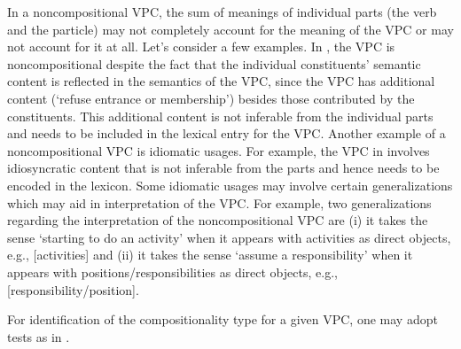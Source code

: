 \documentclass[output=paper
,modfonts
,nonflat]{langsci/langscibook}
\begin{document}
In a noncompositional VPC, the sum of meanings of individual parts (the verb and the particle) may not completely account for the meaning of the VPC or may not account for it at all. Let's consider a few examples. In , the VPC  is noncompositional  despite the fact that the individual constituents' semantic content is reflected in the semantics of the VPC, since the VPC has additional content (`refuse entrance or membership') besides those contributed by the constituents. This additional content is not inferable from the individual parts and needs to be included in the lexical entry for the VPC. Another example of a noncompositional VPC is idiomatic usages. For example, the VPC  in  involves idiosyncratic content that is not inferable from the parts and hence needs to be encoded in the lexicon. Some idiomatic usages may involve certain generalizations which may aid in interpretation of the VPC. For example, two generalizations regarding the interpretation of the noncompositional VPC  are (i) it takes the sense `starting to do an activity' when it appears with activities as direct objects, e.g.,  [activities] and (ii) it takes the sense `assume a responsibility' when it appears with positions/responsibilities as direct objects, e.g.,  [responsibility/position]. 

For identification of the compositionality type for a given VPC, one may adopt tests as in .
\end{document}
